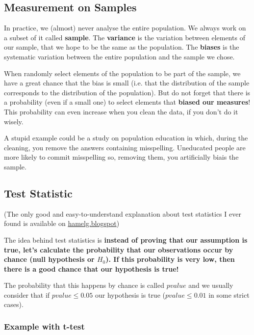 \subsection{Measurement on Samples}

In practice, we (almost) never analyse the entire population. We always work on a subset of it called \textbf{sample}. The \textbf{variance} is the variation between elements of our sample, that we hope to be the same as the population. The \textbf{biases} is the systematic variation between the entire population and the sample we chose.

When randomly select elements of the population to be part of the sample, we have a great chance that the bias is small (i.e. that the distribution of the sample corresponds to the distribution of the population). But do not forget that there is a probability (even if a small one) to select elements that \textbf{biased our measures}! This probability can even increase when you clean the data, if you don't do it wisely.

A stupid example could be a study on population education in which, during the cleaning, you remove the answers containing misspelling. Uneducated people are more likely to commit misspelling so, removing them, you artificially biais the sample.

\subsection{Test Statistic}

(The only good and easy-to-understand explanation about test statistics I ever found is available on \href{http://hamelg.blogspot.ch/2015/11/python-for-data-analysis-part-24.html?view=flipcard}{hamelg.blogspot})

The idea behind test statistics is \textbf{instead of proving that our assumption is true, let's calculate the probability that our observations occur by chance (null hypothesis or $H_0$). If this probability is very low, then there is a good chance that our hypothesis is true!}

The probability that this happens by chance is called $pvalue$ and we usually consider that if $pvalue \leq 0.05$ our hypothesis is true ($pvalue \leq 0.01$ in some strict cases).

\subsubsection{Example with t-test}


